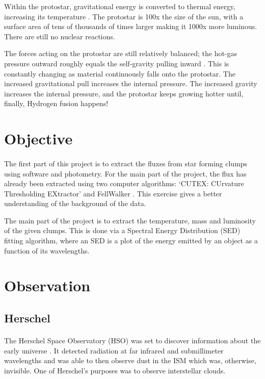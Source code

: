\documentclass{article}
\begin{document}
Within the protostar, gravitational energy is converted to thermal energy, increasing its temperature \cite{Kay2013}. The protostar is 100x the size of the sun, with a surface area of tens of thousands of times larger making it 1000x more luminous. There are still no nuclear reactions. 

The forces acting on the protostar are still relatively balanced; the hot-gas pressure outward roughly equals the self-gravity pulling inward \cite{Kay2013}. This is constantly changing as material continuously falls onto the protostar. The increased gravitational pull increases the internal pressure. The increased gravity increases the internal pressure, and the protostar keeps growing hotter until, finally, Hydrogen fusion happens!

\section{Objective}
\paragraph{}

The first part of this project is to extract the fluxes from star forming clumps using software and photometry. For the main part of the project, the flux has already been extracted using two computer algorithms: ‘CUTEX: CUrvature Thresholding EXtractor’ \cite{Molinari2010} and FellWalker \cite{Berry2015}. This exercise gives a better understanding of the background of the data.

The main part of the project is to extract the temperature, mass and luminosity of the given clumps. This is done via a Spectral Energy Distribution (SED) fitting algorithm, where an SED is a plot of the energy emitted by an object as a function of its wavelengths. 

\section{Observation}
\subsection{Herschel}
\paragraph{}

The Herschel Space Observatory (HSO) was set to discover information about the early universe \cite{HSO2013}. It detected radiation at far infrared and submillimeter wavelengths and was able to then observe dust in the ISM which was, otherwise, invisible. One of Herschel’s purposes was to observe interstellar clouds.
\end{document}
